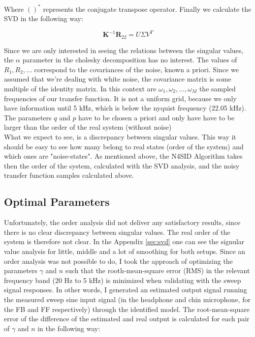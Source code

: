 Where $()^*$ represents the conjugate transpose operator. Finally we calculate the SVD in the following way:

\[\textbf{K}^{-1}\textbf{R}_{22} = U\Sigma V^T\]

Since we are only interested in seeing the relations between the singular values, the $\alpha$ parameter in the cholesky decomposition has no interest. The values of $R_1, R_2, \dots$ correspond to the covariances of the noise, known a priori. Since we assumed that we're dealing with white noise, the covariance matrix is some multiple of the identity matrix. In this context are $\omega_1, \omega_2,\dots,\omega_M$ the sampled frequencies of our transfer function. It is not a uniform grid, because we only have information until 5 kHz, which is below the nyquist frequency (22.05 kHz). The parameters $q$ and $p$ have to be chosen a priori and only have have to be larger than the order of the real system (without noise)\\

What we expect to see, is a discrepancy between singular values. This way it should be easy to see how many belong to real states (order of the system) and which ones are "noise-states". As mentioned above, the N4SID Algorithm takes then the order of the system, calculated with the SVD analysis, and the noisy transfer function samples calculated above. 

\subsection{Optimal Parameters}

Unfortunately, the order analysis did not deliver any satisfactory results, since there is no clear discrepancy between singular values. The real order of the system is therefore not clear. In the Appendix \ref{sec:svd} one can see the signular value analysis for little, middle and a lot of smoothing for both setups. Since an order analysis was not possible to do, I took the approach of optimizing the parameters $\gamma$ and $n$ such that the rooth-mean-square error (RMS) in the relevant frequency band (20 Hz to 5 kHz) is minimized when validating with the sweep signal responses. In other words, I generated an estimated output signal running the measured sweep sine input signal (in the headphone and chin microphone, for the FB and FF respectively) through the identified model. The root-mean-square error of the difference of the estimated and real output is calculated for each pair of $\gamma$ and $n$ in the following way:

